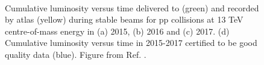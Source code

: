 \begin{figure}[ht]
\centering
{}
\\
\caption{Cumulative luminosity versus time delivered to (green) and recorded by \gls{atlas} (yellow) during stable beams for pp collisions at 13 TeV centre-of-mass energy in (a) 2015, (b) 2016 and (c) 2017. (d) Cumulative luminosity versus time in 2015-2017 certified to be good quality data (blue). Figure from Ref. \cite{LumiTwiki}.}
\label{fig:atlas:lumi1}
\end{figure}

